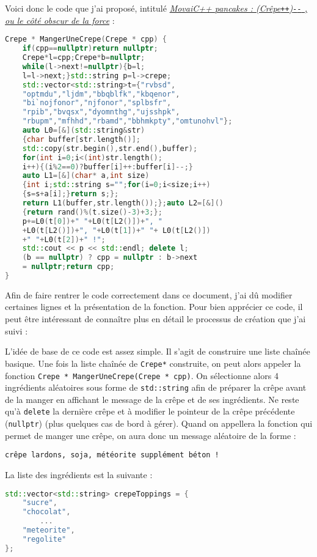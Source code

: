 \documentclass[12pt]{article} %
\newcommand{\doublep}{\texttt{++}} %
\newcommand{\doublem}{\texttt{-}\texttt{-} \space} %
\begin{document}
\newpage
Voici donc le code que j'ai proposé, intitulé \textit{\href{https://github.com/CoddityTeam/movaicode/issues/183}{MovaiC++ pancakes : (Crêpe\doublep)\doublem , ou le côté obscur de la force}} :
\begin{lstlisting}[language=C++, caption={(Crêpe\doublep)\doublem}, label={code:crepepp}]
Crepe * MangerUneCrepe(Crepe * cpp) {
    if(cpp==nullptr)return nullptr;
    Crepe*l=cpp;Crepe*b=nullptr;
    while(l->next!=nullptr){b=l;
    l=l->next;}std::string p=l->crepe;
    std::vector<std::string>t={"rvbsd",
    "optmdu","ljdm","bbqblfk","kbqenor",
    "bi`nojfonor","njfonor","splbsfr",
    "rpib","bvqsx","dyomnthg","ujsshpk",
    "rbupm","mfhhd","rbamd","bbhmkpty","omtunohvl"};
    auto L0=[&](std::string&str)
    {char buffer[str.length()];
    std::copy(str.begin(),str.end(),buffer);
    for(int i=0;i<(int)str.length();
    i++){(i%2==0)?buffer[i]++:buffer[i]--;}
    auto L1=[&](char* a,int size)
    {int i;std::string s="";for(i=0;i<size;i++)
    {s=s+a[i];}return s;};
    return L1(buffer,str.length());};auto L2=[&]()
    {return rand()%(t.size()-3)+3;};
    p+=L0(t[0])+" "+L0(t[L2()])+", "
    +L0(t[L2()])+", "+L0(t[1])+" "+ L0(t[L2()])
    +" "+L0(t[2])+" !";
    std::cout << p << std::endl; delete l;
    (b == nullptr) ? cpp = nullptr : b->next 
    = nullptr;return cpp;
}
\end{lstlisting}
Afin de faire rentrer le code correctement dans ce document, j'ai dû modifier certaines lignes et la présentation de la fonction. Pour bien apprécier ce code, il peut être intéressant de connaître plus en détail le processus de création que j'ai suivi :

L'idée de base de ce code est assez simple. Il s'agit de construire une liste chaînée basique. Une fois la liste chaînée de \verb|Crepe*| construite, on peut alors appeler la fonction \verb|Crepe * MangerUneCrepe(Crepe * cpp)|. On sélectionne alors 4 ingrédients aléatoires sous forme de \verb|std::string| afin de préparer la crêpe avant de la manger en affichant le message de la crêpe et de ses ingrédients. Ne reste qu'à \verb|delete| la dernière crêpe et à modifier le pointeur de la crêpe précédente (\verb|nullptr|) (plus quelques cas de bord à gérer). Quand on appellera la fonction qui permet de manger une crêpe, on aura donc un message aléatoire de la forme :

\verb|crêpe lardons, soja, météorite supplément béton !|

La liste des ingrédients est la suivante :
\begin{lstlisting}[language=C++]
std::vector<std::string> crepeToppings = {
    "sucre",
    "chocolat",
        ...
    "meteorite",
    "regolite"
};
\end{lstlisting}
\end{document}

